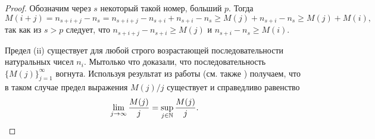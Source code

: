 \begin{proof}
	Обозначим через $s$ некоторый такой номер, больший $p$.
	Тогда
	\begin{equation}
		M(i+j) = n_{s+i+j} - n_s = n_{s+i+j} - n_{s+i} + n_{s+i} - n_s
		\geq M(j) + n_{s+i} - n_s \geq M(j) + M(i),
	\end{equation}
	так как из $s>p$ следует, что $n_{s+i+j} - n_{s+i} \geq M(j)$ и $n_{s+i} - n_s \geq M(i)$.

	Предел (ii)
	существует для любой строго возрастающей последовательности натуральных чисел $n_i$.
	Мытолько что доказали, что последовательность $\{M(j)\}_{j=1}^\infty$ вогнута.
	Используя результат из работы \cite{Fekete} (см. также \cite[I, Задача 98]{polia1978zadachi}) получаем,
	что в таком случае предел выражения $M(j)/j$ существует и справедливо равенство
	\begin{equation}
		\lim_{j\to\infty}\frac{M(j)}{j} =\sup_{j\in\mathbb{N}}\frac{M(j)}{j}
		.
	\end{equation}

\end{proof}
